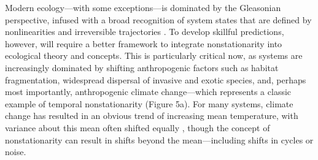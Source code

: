 \documentclass[11pt,a4paper,oneside]{article}
\begin{document}
Modern ecology---with some exceptions---is dominated by the Gleasonian perspective, infused with a broad recognition of system states that are defined by nonlinearities and irreversible trajectories \citep{peters2004}. To develop skillful predictions, however, will require a better framework to integrate nonstationarity into ecological theory and concepts. This is particularly critical now, as systems are increasingly dominated by shifting anthropogenic factors such as habitat fragmentation, widespread dispersal of invasive and exotic species, and, perhaps most importantly, anthropogenic climate change---which represents a classic example of temporal nonstationarity (Figure 5a). For many systems, climate change has resulted in an obvious trend of increasing mean temperature, with variance about this mean often shifted equally \citep{Huntingford2013,Rhines2013}, though the concept of nonstationarity can result in shifts beyond the mean---including shifts in cycles or noise. \\
\end{document}
